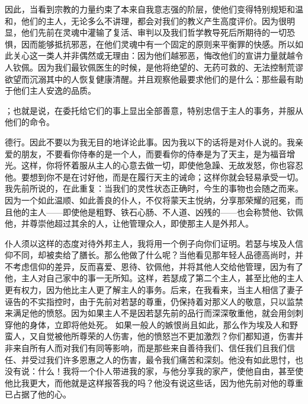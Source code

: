 因此，当看到宗教的力量约束了本来自我意志强的阶层，使他们变得特别规矩和温和，他们的主人，无论多么不讲理，都会对我们的教义产生高度评价。因为很明显，他们先前在灵魂中灌输了复活、审判以及我们哲学教导死后所期待的一切恐惧，因而能够抵抗邪恶，在他们灵魂中有一个固定的原则来平衡罪的快感。所以如此关心这一类人并非偶然或无理由：因为他们越邪恶，悔改他们的宣讲力量就越令人钦佩。因为我们最钦佩医生的时候，是他将绝望的、无药可救的、无法控制荒谬欲望而沉溺其中的人恢复健康清醒。并且观察他最要求他们的是什么：那些最有助于他们主人安逸的品质。\par

；也就是说，在委托给它们的事上显出全部善意，特别忠信于主人的事务，并服从他们的命令。\par

德行。因此不要以为我无目的地详论此事。因为我以下的话将是对仆人说的。我亲爱的朋友，不要看你侍奉的是一个人，而要看你的侍奉是为了天主，是为福音增光。这样，你将怀着服从主人的心意去做一切，即使他急躁、无故发怒，你也容忍他。要想到你不是在讨好他，而是在履行天主的诫命；这样你就会轻易承受一切。我先前所说的，在此重复：当我们的灵性状态正确时，今生的事物也会随之而来。因为一个如此温顺、如此善良的仆人，不仅将蒙天主悦纳，分享那荣耀的冠冕，而且他的主人——即使他是粗野、铁石心肠、不人道、凶残的——也会称赞他、钦佩他，并尊崇他超过其余的人，让他管理众人，即使那主人是外邦人。\par

仆人须以这样的态度对待外邦主人，我将用一个例子向你们证明。若瑟与埃及人信仰不同，却被卖给了膳长。那么他做了什么呢？当他看见那年轻人品德高尚时，并不考虑信仰的差异，反而喜爱、恩待、钦佩他，并将其他人交给他管理，因为有了他，主人对自己家中的事一无所知。这样，若瑟成了第二个主人，甚至比他的主人更有权力，因为他比主人更了解主人的事务。后来，在我看来，当主人相信了妻子诬告的不实指控时，由于先前对若瑟的尊重，仍保持着对那义人的敬意，只以监禁来满足他的愤怒。因为如果主人不是因若瑟先前的品行而深深敬重他，就会用剑刺穿他的身体，立即将他处死。 如果一般人的嫉恨尚且如此，那么作为埃及人和野蛮人，又自觉被他所尊荣的人伤害，他的愤怒岂不更加激烈？你们都知道，伤害并非来自所有人而对我们有同等影响，而是那些来自善待我们、信任我们且我们信任、并受过我们许多恩惠之人的伤害，最令我们痛苦和深刻。他没有如此思忖，也没有说：什么！我将一个仆人带进我的家，与他分享我的家产，使他自由，甚至使他比我更大，而他就是这样报答我的吗？他没有说这些话，因为他先前对他的尊重已占据了他的心。\par


